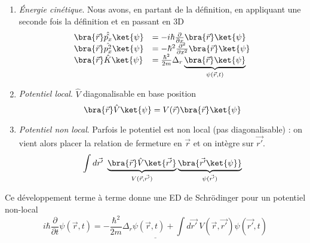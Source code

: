 	\begin{enumerate}
	\item \textit{Énergie cinétique}. Nous avons, en partant de la définition, en appliquant une 
	seconde fois la définition et en passant en 3D
	\begin{equation}
	\begin{array}{ll}
	\bra{\vec{r}}\hat{\hat{p_x}}\ket{\psi} &= -i\hbar\frac{\partial}{\partial x}\bra{\vec{r}}\ket{\psi}\\
	\bra{\vec{r}}\hat{p_x^2}\ket{\psi} &= -\hbar^2\frac{\partial^2}{\partial x^2}\bra{\vec{r}}\ket{\psi}	\\
	\bra{\vec{r}}\hat{K}\ket{\psi} &= \frac{\hbar^2}
	{2m}\Delta_r\underbrace{\bra{\vec{r}}\ket{\psi}}_{\psi(\vec{r},t)}
	\end{array}
	\end{equation}
	
	\item \textit{Potentiel local}. $\hat V$ diagonalisable en base position
	\begin{equation}
	\bra{\vec{r}}\hat{V}\ket{\psi} = V(\vec{r})\bra{\vec{r}}\ket{\psi}
	\end{equation}
	
	\item \textit{Potentiel non local}. Parfois le potentiel est non local (pas diagonalisable) : on vient 
	alors placer la relation de fermeture en $\vec r$ et on intègre sur $\vec{r'}$.
	\begin{equation}
	\int d\vec{r'}\ \underbrace{\bra{\vec{r}}\hat{V}\ket{\vec{r'}}}_{V(\vec{r},\vec{r'})}\underbrace{
	\bra{\vec{r'}\ket{\psi}}}_{\psi(\vec{r'})}
	\end{equation}
	\end{enumerate}
	Ce développement terme à terme donne une ED de Schrödinger pour un potentiel non-local
	\begin{equation}
	\underline{i\hbar\frac{\partial}{\partial t}\psi(\vec{r},t) = -\frac{\hbar^2}{2m}\Delta_r\psi(\vec{r},t)+\int 
	d\vec{r'}\ V(\vec{r},\vec{r'})\psi(\vec{r'},t)}
	\end{equation}

